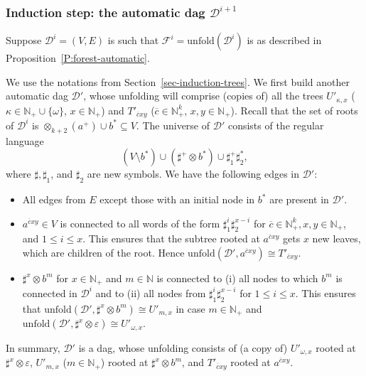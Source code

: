 \documentclass[envcountsame]{llncs}
\newcommand{\unfold}{\mathrm{unfold}}
\newcommand{\N}{\mathbb N}
\begin{document}
\subsubsection{Induction step: the automatic dag $\mathcal D^{i+1}$}
\label{sec-induction-automatic-trees}

Suppose $\mathcal D^i=(V,E)$ is such that $\mathcal F^i = \unfold(\mathcal
D^i)$ is as described in Proposition~\ref{P:forest-automatic}.

We use the notations from Section~\ref{sec-induction-trees}. We first
build another automatic dag $\mathcal D'$, whose unfolding will comprise (copies
of) all the trees $U'_{\kappa,x}$ ($\kappa \in \N_+\cup\{\omega\}$, $x \in
\N_+$) and $T'_{\overline cxy}$ ($\overline c \in \N_+^k$, $x,y \in \N_+$).
Recall that the set of roots of $\mathcal D^i$ is
$\otimes_{k+2}(a^+) \cup b^* \subseteq V$.
The universe of $\mathcal D'$ consists of the regular language
$$
(V \setminus b^*) \cup  (\sharp^+ \otimes b^*) \cup \sharp_1^+ \sharp_2^*,
$$
where $\sharp, \sharp_1$, and $\sharp_2$ are new symbols.
We have the following edges in $\mathcal D'$:
\begin{itemize}
\item All edges from $E$ except those with an initial node in $b^*$
are present in $\mathcal D'$.
\item $a^{\overline c xy} \in V$ is connected to all words of the form
$\sharp_1^i \sharp_2^{x-i}$ for $\overline c \in \N_+^k,x,y \in \N_+$, and $1 \leq i \leq x$.
This ensures that the subtree rooted at $a^{\overline c xy}$ gets $x$ new leaves,
which are children of the root. Hence $\unfold(\mathcal D',a^{\overline c xy})
\cong T'_{\overline cxy}$.
\item $\sharp^x \otimes b^m$ for $x \in \N_+$ and $m \in \N$
 is connected  to (i) all nodes to which $b^m$ is connected
in $\mathcal D^i$ and  to (ii) all nodes from $\sharp_1^i \sharp_2^{x-i}$ for $1 \leq i \leq x$.
This ensures that $\unfold(\mathcal D',\sharp^x \otimes b^m)
 \cong U'_{m,x}$ in case $m \in \N_+$ and $\unfold(\mathcal D',\sharp^x \otimes \varepsilon)
 \cong U'_{\omega,x}$.
\end{itemize}
In summary, $\mathcal D'$ is a dag, whose unfolding
consists of (a copy
of) $U'_{\omega,x}$ rooted at $\sharp^x\otimes\varepsilon$, $U'_{m,x}$ ($m \in \N_+$)
rooted at $\sharp^x \otimes b^m$, and $T'_{\overline cxy}$ rooted at
$a^{\overline cxy}$.
\end{document}
